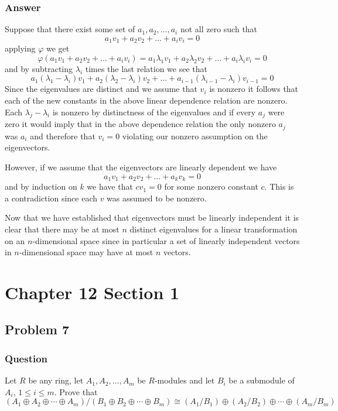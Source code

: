 \documentclass[12pt]{article}
\begin{document}
\subsubsection{Answer}
Suppose that there exist some set of $a_1,a_2,\dots,a_i$ not all zero such that
\[a_1v_1+ a_2v_2 + \dots + a_iv_i=0\]
applying $\varphi$ we get 
\[\varphi(a_1v_1+ a_2v_2 + \dots + a_iv_i)=a_1\lambda_1 v_1 + a_2 \lambda_2 v_2 + \dots + a_i\lambda_i v_i =0\]
and by subtracting $\lambda_i$ times the last relation we see that
\[a_1(\lambda_1 - \lambda_i) v_1 + a_2 (\lambda_2-\lambda_i) v_2 + \dots + a_{i-1} (\lambda_{i-1} - \lambda_i) v_{i-1} = 0\]
Since the eigenvalues are distinct and we assume that $v_i$ is nonzero it follows that each of the new constants in the above linear dependence relation are nonzero. Each $\lambda_j - \lambda_i$ is nonzero by distinctness of the eigenvalues and if every $a_j$ were zero it would imply that in the above dependence relation the only nonzero $a_j$ was $a_i$ and therefore that $v_i = 0$ violating our nonzero assumption on the eigenvectors.

However, if we assume that the eigenvectors are linearly dependent we have 
\[a_1 v_1 + a_2 v_2  + \dots +a_k v_k=0\]
and by induction on $k$ we have that $c v_1=0$ for some nonzero constant $c$. This is a contradiction since each $v$ was assumed to be nonzero.

Now that we have established that eigenvectors must be linearly independent it is clear that there may be at most $n$ distinct eigenvalues for a linear transformation on an $n$-dimensional space since in particular a set of linearly independent vectors in $n$-dimensional space may have at most $n$ vectors.


\section{Chapter 12 Section 1}
\subsection{Problem 7}
\subsubsection{Question}
Let $R$ be any ring, let $A_1, A_2, \dots, A_m$ be $R$-modules and let $B_i$ be a submodule of $A_i$, $1\leq i \leq m$. Prove that 
\[ (A_1 \oplus A_2 \oplus \cdots \oplus A_m ) / (B_1 \oplus B_2 \oplus \cdots \oplus B_m) \cong (A_1/B_1) \oplus (A_2 / B_2) \oplus \cdots \oplus (A_m / B_m)\]
\end{document}
